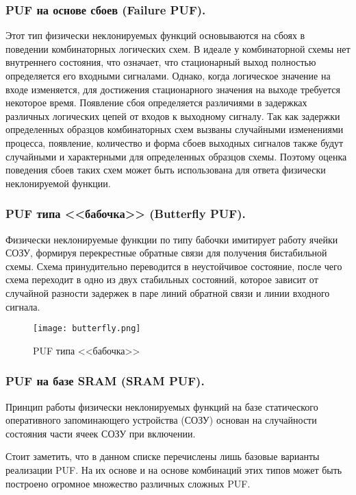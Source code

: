 \subsubsection{PUF на основе сбоев (Failure PUF). }
\label{sub:domain:puf_types:failure_puf}

Этот тип физически неклонируемых функций основываются на сбоях в поведении комбинаторных логических схем. В идеале у комбинаторной схемы нет внутреннего состояния, что означает, что стационарный выход полностью определяется его входными сигналами. Однако, когда логическое значение на входе изменяется, для достижения стационарного значения на выходе требуется некоторое время. Появление сбоя определяется различиями в задержках различных логических цепей от входов к выходному сигналу. Так как задержки определенных образцов комбинаторных схем вызваны случайными изменениями процесса, появление, количество и форма сбоев выходных сигналов также будут случайными и характерными для определенных образцов схемы. Поэтому оценка поведения сбоев таких схем может быть использована для ответа физически неклонируемой функции.


\subsubsection{PUF типа <<бабочка>> (Butterfly PUF). }
\label{sub:domain:puf_types:butterfly}
Физически неклонируемые функции по типу бабочки имитирует работу ячейки СОЗУ, формируя перекрестные обратные связи для получения бистабильной схемы. Схема принудительно переводится в неустойчивое состояние, после чего схема переходит в одно из двух стабильных состояний, которое зависит от случайной разности задержек в паре линий обратной связи и линии входного сигнала.
\begin{figure}[ht]
    \centering
    \label{fig:domain:puf_types:butterfly}
    \texttt{[image: butterfly.png]}
    \caption{PUF типа <<бабочка>>}
\end{figure}


\subsubsection{PUF на базе SRAM (SRAM PUF). }
\label{sub:domain:puf_types:sram}
Принцип работы физически неклонируемых функций на базе статического оперативного запоминающего устройства (СОЗУ) основан на случайности состояния части ячеек СОЗУ при включении.

Стоит заметить, что в данном списке перечислены лишь базовые варианты реализации PUF. На их основе и на основе комбинаций этих типов может быть построено огромное множество различных сложных PUF. ~\cite{cryptowiki_pufs, rmaes_pufs}



